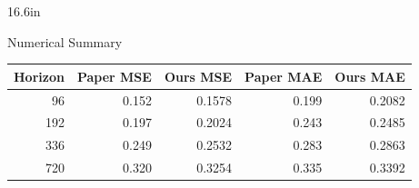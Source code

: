 \documentclass[final]{beamer}
\begin{document}
\begin{frame}[t]
\begin{columns}[t,totalwidth=33.2in]
\begin{column}{16.6in}
\begin{block}{Numerical Summary}
\begin{center}
\normalsize
\begin{tabular}{rrrrr}
\toprule
Horizon & Paper MSE & Ours MSE & Paper MAE & Ours MAE \\
\midrule
96  & 0.152 & 0.1578 & 0.199 & 0.2082 \\
192 & 0.197 & 0.2024 & 0.243 & 0.2485 \\
336 & 0.249 & 0.2532 & 0.283 & 0.2863 \\
720 & 0.320 & 0.3254 & 0.335 & 0.3392 \\
\bottomrule
\end{tabular}
\end{center}
\end{block}

\end{column}

\end{columns}

\end{frame}
\end{document}
